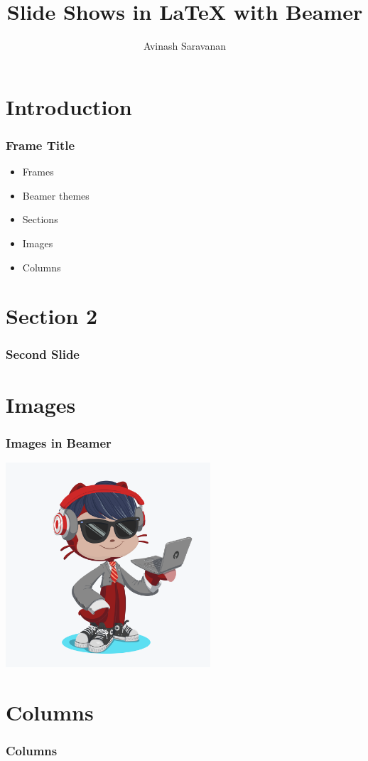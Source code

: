 \documentclass{beamer}
\title{Slide Shows in {\LaTeX} with Beamer}
\author{Avinash Saravanan}
\begin{document}
\maketitle

\section{Introduction}

\begin{frame}
\frametitle{Frame Title}

\begin{itemize}
\item Frames\pause
\item Beamer themes\pause
\item Sections\pause
\item Images\pause
\item Columns
\end{itemize}
\end{frame}

\section{Section 2}

\begin{frame}
\frametitle{Second Slide}
\end{frame}

\section{Images}
\begin{frame}
\frametitle{Images in Beamer}
\includegraphics[width=3in]{octocat.png}
\end{frame}

\section{Columns}
\begin{frame}
\frametitle{Columns}

\begin{columns}

\blindtext
{}
\blindtext

\end{columns}

\end{frame}
\end{document}
